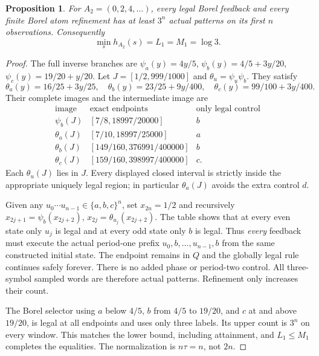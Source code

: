 \documentclass[11pt,reqno]{amsart}
\numberwithin{equation}{section}
\newtheorem{proposition}[theorem]{Proposition}
\theoremstyle{definition}
\begin{document}
\begin{proposition}\label{prop:bridge}
For $A_2=(0,2,4,\ldots)$, every legal Borel feedback and every
finite Borel atom refinement has at least $3^n$ actual patterns
on its first $n$ observations. Consequently
\[
 \min_s h_{A_2}(s)=L_1=M_1=\log3.
\]
\end{proposition}
\begin{proof}
The full inverse branches are
$\psi_a(y)=4y/5$, $\psi_b(y)=4/5+3y/20$,
$\psi_c(y)=19/20+y/20$. Let $J=[1/2,999/1000]$ and
$\theta_u=\psi_u\psi_b$. They satisfy
\[
 \theta_a(y)=16/25+3y/25,\quad
 \theta_b(y)=23/25+9y/400,\quad
 \theta_c(y)=99/100+3y/400.
\]
Their complete images and the intermediate image are
\[
\begin{array}{c|c|c}
 \text{image}&\text{exact endpoints}&\text{only legal control}\\\hline
 \psi_b(J)&[7/8,18997/20000]&b\\
 \theta_a(J)&[7/10,18997/25000]&a\\
 \theta_b(J)&[149/160,376991/400000]&b\\
 \theta_c(J)&[159/160,398997/400000]&c.
\end{array}
\]
Each $\theta_u(J)$ lies in $J$. Every displayed closed interval
is strictly inside the appropriate uniquely legal region; in
particular $\theta_a(J)$ avoids the extra control $d$.

Given any $u_0\cdots u_{n-1}\in\{a,b,c\}^n$, set
$x_{2n}=1/2$ and recursively
$x_{2j+1}=\psi_b(x_{2j+2})$,
$x_{2j}=\theta_{u_j}(x_{2j+2})$.
The table shows that at every even state only $u_j$ is legal
and at every odd state only $b$ is legal. Thus \emph{every}
feedback must execute the actual period-one prefix
$u_0,b,\ldots,u_{n-1},b$ from the same constructed initial state.
The endpoint remains in $Q$ and the globally legal rule continues
safely forever. There is no added phase or period-two control.
All three-symbol sampled words are therefore actual patterns.
Refinement only increases their count.

The Borel selector using $a$ below $4/5$, $b$ from $4/5$ to
$19/20$, and $c$ at and above $19/20$, is legal at all endpoints
and uses only three labels. Its upper count is $3^n$ on every
window. This matches the lower bound, including attainment, and
$L_1\le M_1$ completes the equalities. The normalization is
$n\tau=n$, not $2n$.
\end{proof}
\end{document}
